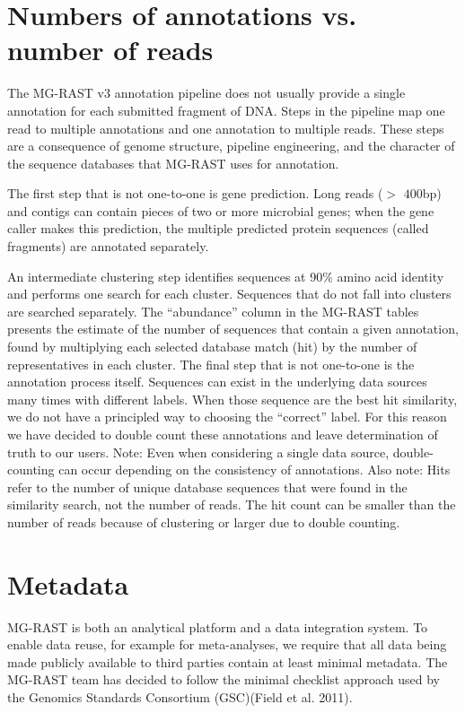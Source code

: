 \documentclass[letterpaper,10pt,english]{sphinxmanual}
\begin{document}
\section{Numbers of annotations vs. number of reads}
\label{\detokenize{user_manual:numbers-of-annotations-vs-number-of-reads}}\label{\detokenize{user_manual:section-annotation-numbers}}
The MG-RAST v3 annotation pipeline does not usually provide a single
annotation for each submitted fragment of DNA. Steps in the pipeline map
one read to multiple annotations and one annotation to multiple reads.
These steps are a consequence of genome structure, pipeline engineering,
and the character of the sequence databases that MG-RAST uses for
annotation.

The first step that is not one-to-one is gene prediction. Long reads
(\(>\) \(400\)bp) and contigs can contain pieces of two or
more microbial genes; when the gene caller makes this prediction, the
multiple predicted protein sequences (called fragments) are annotated
separately.

An intermediate clustering step identifies sequences at 90\% amino acid
identity and performs one search for each cluster. Sequences that do not
fall into clusters are searched separately. The “abundance” column in
the MG-RAST tables presents the estimate of the number of sequences that
contain a given annotation, found by multiplying each selected database
match (hit) by the number of representatives in each cluster. The final
step that is not one-to-one is the annotation process itself. Sequences
can exist in the underlying data sources many times with different
labels. When those sequence are the best hit similarity, we do not have
a principled way to choosing the “correct” label. For this reason we
have decided to double count these annotations and leave determination
of truth to our users. Note: Even when considering a single data source,
double-counting can occur depending on the consistency of annotations.
Also note: Hits refer to the number of unique database sequences that
were found in the similarity search, not the number of reads. The hit
count can be smaller than the number of reads because of clustering or
larger due to double counting.


\section{Metadata}
\label{\detokenize{user_manual:metadata}}\label{\detokenize{user_manual:section-metadata}}
MG-RAST is both an analytical platform and a data integration system. To
enable data reuse, for example for meta-analyses, we require that all
data being made publicly available to third parties contain at least
minimal metadata. The MG-RAST team has decided to follow the minimal
checklist approach used by the Genomics Standards Consortium (GSC)(Field
et al. 2011).
\end{document}
